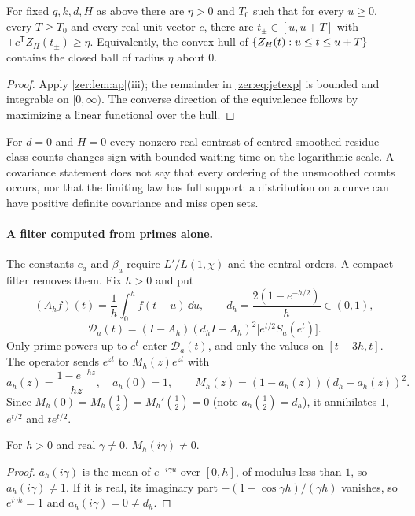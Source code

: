 \begin{corollary}\label{zer:cor:jetosc}
For fixed $q,k,d,H$ as above there are $\eta>0$ and $T_0$ such that for every $u\ge0$, every
$T\ge T_0$ and every real unit vector $c$, there are $t_\pm\in[u,u+T]$ with
$\pm c^{\mathsf T}Z_H(t_\pm)\ge\eta$. Equivalently, the convex hull of
$\{Z_H(t):u\le t\le u+T\}$ contains the closed ball of radius $\eta$ about $0$.
\end{corollary}
\begin{proof}
Apply \cref{zer:lem:ap}(iii); the remainder in \eqref{zer:eq:jetexp} is bounded and
integrable on $[0,\infty)$. The converse direction of the equivalence follows by maximizing a
linear functional over the hull.
\end{proof}

For $d=0$ and $H=0$ every nonzero real contrast of centred smoothed residue-class counts
changes sign with bounded waiting time on the logarithmic scale. A covariance statement does
not say that every ordering of the unsmoothed counts occurs, nor that the limiting law has full
support: a distribution on a curve can have positive definite covariance and miss open sets.

\paragraph{A filter computed from primes alone.}
The constants $c_a$ and $\beta_a$ require $L'/L(1,\chi)$ and the central orders. A compact filter
removes them. Fix $h>0$ and put
\[
 (A_hf)(t)=\frac1h\int_0^hf(t-u)\,\dd u,\qquad d_h=\frac{2(1-e^{-h/2})}h\in(0,1),
\]
\[
 \mathcal D_a(t)=(I-A_h)(d_hI-A_h)^2\bigl[e^{t/2}S_a(e^t)\bigr].
\]
Only prime powers up to $e^t$ enter $\mathcal D_a(t)$, and only the values on $[t-3h,t]$. The
operator sends $e^{zt}$ to $M_h(z)e^{zt}$ with
\[
 a_h(z)=\frac{1-e^{-hz}}{hz},\quad a_h(0)=1,\qquad M_h(z)=(1-a_h(z))(d_h-a_h(z))^2 .
\]
Since $M_h(0)=M_h(\tfrac12)=M_h'(\tfrac12)=0$ (note $a_h(\tfrac12)=d_h$), it annihilates $1$,
$e^{t/2}$ and $te^{t/2}$.

\begin{lemma}\label{zer:lem:multiplier}
For $h>0$ and real $\gamma\ne0$, $M_h(i\gamma)\ne0$.
\end{lemma}
\begin{proof}
$a_h(i\gamma)$ is the mean of $e^{-i\gamma u}$ over $[0,h]$, of modulus less than $1$, so
$a_h(i\gamma)\ne1$. If it is real, its imaginary part $-(1-\cos\gamma h)/(\gamma h)$ vanishes, so
$e^{i\gamma h}=1$ and $a_h(i\gamma)=0\ne d_h$.
\end{proof}


